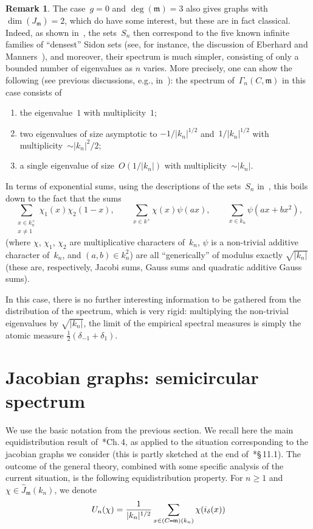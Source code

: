 \documentclass[12pt]{amsart}
\renewcommand{\geq}{\geqslant}
\numberwithin{equation}{section}
\def\setminus{\mathchoice
    {\mathbin{\vrule height .62ex width 1.61ex depth -.38ex}}%
    {\mathbin{\vrule height .62ex width 1.61ex depth -.38ex}}%
    {\mathbin{\vrule height .50ex width 0.85ex depth -.28ex}}%
    {\mathbin{\vrule height .20ex width 0.570ex depth -.24ex}}%
}
\newcommand{\mfm}{\mathfrak{m}}
\newcommand{\demi}{{\textstyle{\frac{1}{2}}}}
\theoremstyle{plain}
\theoremstyle{remark}
\theoremstyle{definition}
\newtheorem{remark}[theorem]{Remark}
\renewcommand{\geq}{\geqslant}
\begin{document}
\begin{remark}
  The case~$g=0$ and $\deg(\mfm)=3$ also gives graphs with
  $\dim(J_{\mfm})=2$, which do have some interest, but these are in fact
  classical. Indeed, as shown in~\cite{ffk2}, the
  sets~$S_n$ then correspond to the
  five known infinite families of ``densest'' Sidon sets (see, for
  instance, the discussion of Eberhard and Manners~\cite{e-m}), and
  moreover, their spectrum is much simpler, consisting of only a bounded
  number of eigenvalues as $n$ varies.  More precisely, one can show
  the following (see previous discussions, e.g., in~\cites{mw,ks}): the
  spectrum of~$\Gamma_n(C,\mfm)$ in this case consists of
  \begin{enumerate}
  \item the eigenvalue~$1$ with multiplicity~$1$; 
  \item two eigenvalues of size asymptotic to $-1/|k_n|^{1/2}$
    and~$1/|k_n|^{1/2}$ with multiplicity~$\sim |k_n|^2/2$;
  \item a single eigenvalue of size~$O(1/|k_n|)$ with
    multiplicity~$\sim |k_n|$.
  \end{enumerate}

  In terms of exponential sums, using the descriptions of the sets~$S_n$
  in~\cite{ffk2}, this boils down to the fact that the sums
  \[
    \sum_{\substack{x\in k_n^{\times}\\x\not=1}}\chi_1(x)\chi_2(1-x),
    \quad\quad
    \sum_{x\in k^{\times}}\chi(x)\psi(ax),\quad\quad
    \sum_{x\in k_n}\psi(ax+bx^2),
  \]
  (where $\chi$, $\chi_1$, $\chi_2$ are multiplicative characters
  of~$k_n$,  $\psi$ is a non-trivial additive character of~$k_n$, and
  $(a,b)\in k_n^2$) are all ``generically'' of modulus exactly
  $\sqrt{|k_n|}$ (these are, respectively, Jacobi sums, Gauss sums and
  quadratic additive Gauss sums).
    
  In this case, there is no further interesting information to be
  gathered from the distribution of the spectrum, which is very rigid:
  multiplying the non-trivial eigenvalues by $\sqrt{|k_n|}$, the limit
  of the empirical spectral measures is simply the atomic measure
  $\demi (\delta_{-1}+\delta_1)$.
\end{remark}


\section{Jacobian graphs: semicircular spectrum}

We use the basic notation from the previous section. 
We recall here the main equidistribution result of~\cite{ffk}*{Ch.\,4},
as applied to the situation corresponding to the jacobian graphs we
consider (this is partly sketched at the end
of~\cite{ffk}*{\S\,11.1}). The outcome of the general theory, combined
with some specific analysis of the current situation, is the following
equidistribution property. For $n\geq 1$ and $\chi\in
\widehat{J}_{\mfm}(k_n)$, we denote
\[
  U_n(\chi)=\frac{1}{|k_n|^{1/2}}\sum_{x\in (C\setminus \mfm)(k_n)}
  \chi(i_{\delta}(x))
\]
\end{document}
